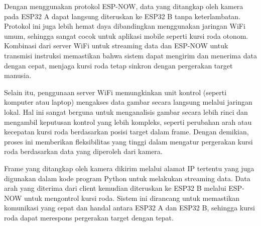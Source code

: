 Dengan menggunakan protokol ESP-NOW, data yang ditangkap oleh kamera pada ESP32 A dapat langsung diteruskan ke ESP32 B tanpa keterlambatan. Protokol ini juga lebih hemat daya dibandingkan menggunakan jaringan WiFi umum, sehingga sangat cocok untuk aplikasi mobile seperti kursi roda otonom. Kombinasi dari server WiFi untuk streaming data dan ESP-NOW untuk transmisi instruksi memastikan bahwa sistem dapat mengirim dan menerima data dengan cepat, menjaga kursi roda tetap sinkron dengan pergerakan target manusia.

Selain itu, penggunaan server WiFi memungkinkan unit kontrol (seperti komputer atau laptop) mengakses data gambar secara langsung melalui jaringan lokal. Hal ini sangat berguna untuk menganalisis gambar secara lebih rinci dan mengambil keputusan kontrol yang lebih kompleks, seperti perubahan arah atau kecepatan kursi roda berdasarkan posisi target dalam frame. Dengan demikian, proses ini memberikan fleksibilitas yang tinggi dalam mengatur pergerakan kursi roda berdasarkan data yang diperoleh dari kamera.

Frame yang ditangkap oleh kamera dikirim melalui alamat IP tertentu yang juga digunakan dalam kode program Python untuk melakukan streaming data. Data arah yang diterima dari client kemudian diteruskan ke ESP32 B melalui ESP-NOW untuk mengontrol kursi roda. Sistem ini dirancang untuk memastikan komunikasi yang cepat dan handal antara ESP32 A dan ESP32 B, sehingga kursi roda dapat merespons pergerakan target dengan tepat.

